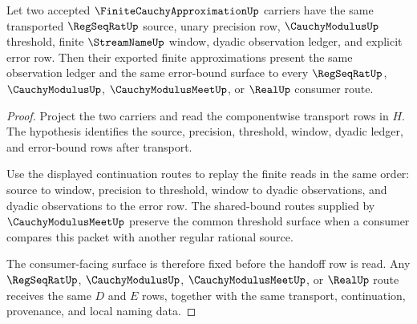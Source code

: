 \begin{theorem}
\label{thm:finite-cauchy-approximation-refinement-stability}
Let two accepted $\FiniteCauchyApproximationUp$ carriers have the same transported $\RegSeqRatUp$ source, unary precision row, $\CauchyModulusUp$ threshold, finite $\StreamNameUp$ window, dyadic observation ledger, and explicit error row. Then their exported finite approximations present the same observation ledger and the same error-bound surface to every $\RegSeqRatUp$, $\CauchyModulusUp$, $\CauchyModulusMeetUp$, or $\RealUp$ consumer route.
\end{theorem}
\begin{proof}
Project the two carriers and read the componentwise transport rows in $H$. The hypothesis identifies the source, precision, threshold, window, dyadic ledger, and error-bound rows after transport.

Use the displayed continuation routes to replay the finite reads in the same order: source to window, precision to threshold, window to dyadic observations, and dyadic observations to the error row. The shared-bound routes supplied by $\CauchyModulusMeetUp$ preserve the common threshold surface when a consumer compares this packet with another regular rational source.

The consumer-facing surface is therefore fixed before the handoff row is read. Any $\RegSeqRatUp$, $\CauchyModulusUp$, $\CauchyModulusMeetUp$, or $\RealUp$ route receives the same $D$ and $E$ rows, together with the same transport, continuation, provenance, and local naming data.
\end{proof}

